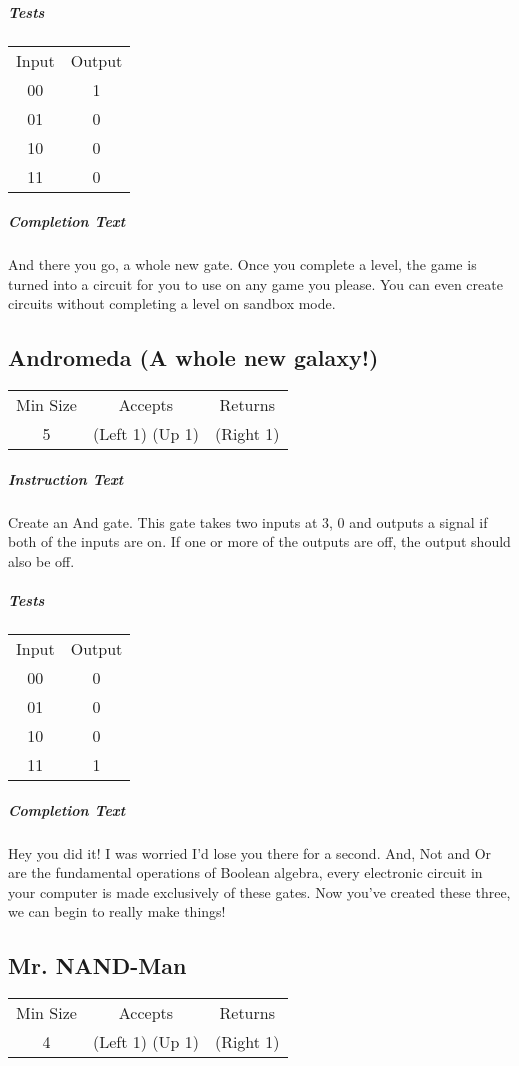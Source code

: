 \documentclass[a4paper, 12pt]{article}
\begin{document}
\subparagraph{Tests}
\begin{tabular}{cc}
	Input & Output \\
	00 & 1 \\
	01 & 0 \\
	10 & 0 \\
	11 & 0
\end{tabular}

\subparagraph{Completion Text}
And there you go, a whole new gate. Once you complete a level, the game is turned into a circuit for you to use on any game you please. You can even create circuits without completing a level on sandbox mode.

\subsection{Andromeda (A whole new galaxy!)}
\begin{tabular}{ccc}
	Min Size & Accepts & Returns \\
	5 & (Left 1) (Up 1) & (Right 1)
\end{tabular}

\subparagraph{Instruction Text}
Create an And gate. This gate takes two inputs at 3, 0 and outputs a signal if both of the inputs are on. If one or more of the outputs are off, the output should also be off.

\subparagraph{Tests}
\begin{tabular}{cc}
	Input & Output \\
	00 & 0 \\
	01 & 0 \\
	10 & 0 \\
	11 & 1
\end{tabular}

\subparagraph{Completion Text}
Hey you did it! I was worried I'd lose you there for a second. And, Not and Or are the fundamental operations of Boolean algebra, every electronic circuit in your computer is made exclusively of these gates. Now you’ve created these three, we can begin to really make things!

\subsection{Mr. NAND-Man}
\begin{tabular}{ccc}
	Min Size & Accepts & Returns \\
	4 & (Left 1) (Up 1) & (Right 1)
\end{tabular}
\end{document}
